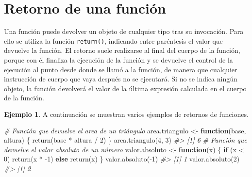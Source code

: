 \documentclass[
]{book}
\newenvironment{Shaded}{\begin{snugshade}}{\end{snugshade}}
\newcommand{\CommentTok}[1]{\textcolor[rgb]{0.56,0.35,0.01}{\textit{#1}}}
\newcommand{\ControlFlowTok}[1]{\textcolor[rgb]{0.13,0.29,0.53}{\textbf{#1}}}
\newcommand{\DecValTok}[1]{\textcolor[rgb]{0.00,0.00,0.81}{#1}}
\newcommand{\FunctionTok}[1]{\textcolor[rgb]{0.00,0.00,0.00}{#1}}
\newcommand{\NormalTok}[1]{#1}
\newcommand{\OtherTok}[1]{\textcolor[rgb]{0.56,0.35,0.01}{#1}}
\newcommand{\SpecialCharTok}[1]{\textcolor[rgb]{0.00,0.00,0.00}{#1}}
\theoremstyle{definition}
\theoremstyle{definition}
\newtheorem{example}{Ejemplo}[chapter]
\theoremstyle{definition}
\theoremstyle{definition}
\theoremstyle{remark}
\begin{document}
\hypertarget{retorno-de-una-funciuxf3n}{%
\section{Retorno de una función}\label{retorno-de-una-funciuxf3n}}

Una función puede devolver un objeto de cualquier tipo tras su invocación. Para ello se utiliza la función \texttt{return()}, indicando entre paréntesis el valor que devuelve la función. El retorno suele realizarse al final del cuerpo de la función, porque con él finaliza la ejecución de la función y se devuelve el control de la ejecución al punto desde donde se llamó a la función, de manera que cualquier instrucción de cuerpo que vaya después no se ejecutará. Si no se indica ningún objeto, la función devolverá el valor de la última expresión calculada en el cuerpo de la función.

\begin{example}

A continuación se muestran varios ejemplos de retornos de funciones.

\begin{Shaded}
\begin{Highlighting}[]
\CommentTok{\# Función que devuelve el area de un triángulo}
\NormalTok{area.triangulo }\OtherTok{\textless{}{-}} \ControlFlowTok{function}\NormalTok{(base, altura) \{}
  \FunctionTok{return}\NormalTok{(base }\SpecialCharTok{*}\NormalTok{ altura }\SpecialCharTok{/} \DecValTok{2}\NormalTok{)}
\NormalTok{\}}
\FunctionTok{area.triangulo}\NormalTok{(}\DecValTok{4}\NormalTok{, }\DecValTok{3}\NormalTok{)}
\CommentTok{\#\textgreater{} [1] 6}
\CommentTok{\# Función que devuelve el valor absoluto de un número}
\NormalTok{valor.absoluto }\OtherTok{\textless{}{-}} \ControlFlowTok{function}\NormalTok{(x) \{}
  \ControlFlowTok{if}\NormalTok{ (x }\SpecialCharTok{\textless{}} \DecValTok{0}\NormalTok{)}
    \FunctionTok{return}\NormalTok{(x }\SpecialCharTok{*} \SpecialCharTok{{-}}\DecValTok{1}\NormalTok{)}
  \ControlFlowTok{else}
    \FunctionTok{return}\NormalTok{(x)}
\NormalTok{\}}
\FunctionTok{valor.absoluto}\NormalTok{(}\SpecialCharTok{{-}}\DecValTok{1}\NormalTok{)}
\CommentTok{\#\textgreater{} [1] 1}
\FunctionTok{valor.absoluto}\NormalTok{(}\DecValTok{2}\NormalTok{)}
\CommentTok{\#\textgreater{} [1] 2}
\end{Highlighting}
\end{Shaded}

\end{example}
\end{document}
